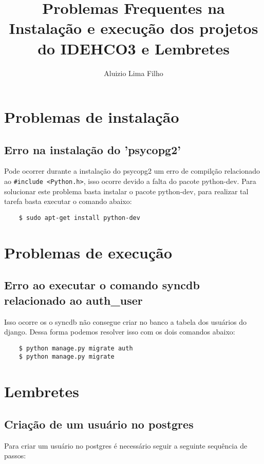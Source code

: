 \documentclass[12pt,a4paper]{article}
\title{Problemas Frequentes na Instalação e execução dos projetos do IDEHCO3 e Lembretes}
\author{Aluizio Lima Filho}
\begin{document}
	
\maketitle

\section{Problemas de instalação}

\subsection{Erro na instalação do 'psycopg2'}
Pode ocorrer durante a instalação do psycopg2 um erro de compilção relacionado ao \verb|#include <Python.h>|, isso ocorre devido a falta do pacote python-dev.
Para solucionar este problema basta instalar o pacote python-dev,
para realizar tal tarefa basta executar o comando abaixo:
\begin{verbatim}
	$ sudo apt-get install python-dev
\end{verbatim}


\section{Problemas de execução}

\subsection{Erro ao executar o comando syncdb relacionado ao auth\_user}
Isso ocorre os o syncdb não consegue criar no banco a tabela dos usuários do django. Dessa forma podemos resolver isso com os dois comandos abaixo:

\begin{verbatim}
	$ python manage.py migrate auth
	$ python manage.py migrate
\end{verbatim}

\section{Lembretes}

\subsection{Criação de um usuário no postgres}
Para criar um usuário no postgres é necessário seguir a seguinte sequência de passos:
\end{document}
